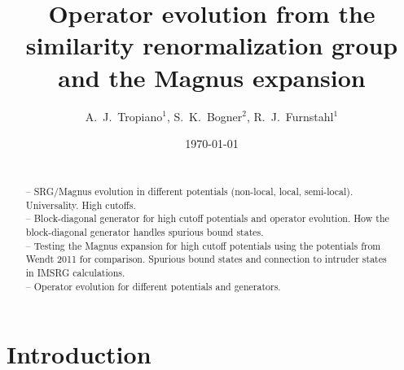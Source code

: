 \documentclass[preprintnumbers,floatfix,aps,prc,preprint,nofootinbib]{revtex4-1}
\begin{document}
\title{Operator evolution from the similarity renormalization group and the Magnus expansion}


\author{A.~J.~Tropiano$^{1}$, S.~K.~Bogner$^{2}$, R.~J.~Furnstahl$^{1}$}


\date{\today}

\begin{abstract}

\\
-- SRG/Magnus evolution in different potentials (non-local, local, semi-local). Universality. High cutoffs.
\\
-- Block-diagonal generator for high cutoff potentials and operator evolution. How the block-diagonal generator handles spurious bound states.
\\
-- Testing the Magnus expansion for high cutoff potentials using the potentials from Wendt 2011 for comparison. Spurious bound states and connection to intruder states in IMSRG calculations.
\\
-- Operator evolution for different potentials and generators.

\end{abstract}

\maketitle

\newpage


\section{Introduction}
\label{sec:intro}
\end{document}
